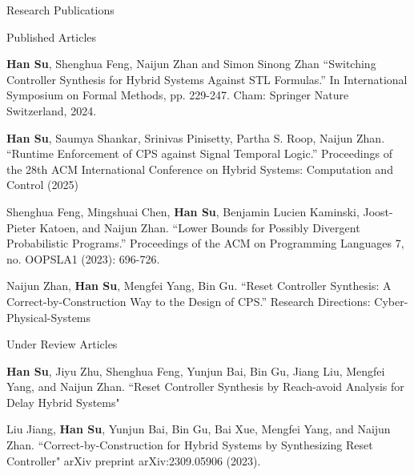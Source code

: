 \documentclass[
	10pt, %
]{resume} %
\newcommand{\fileicon}{\scriptsize{\textcolor{myblue}{\faFile}}}
\begin{document}
\begin{rSection}{Research Publications}
    \begin{rSubsection}{Published Articles}{}{}{}
		\item \textbf{Han Su}, Shenghua Feng, Naijun Zhan and Simon Sinong Zhan ``Switching Controller Synthesis for Hybrid Systems Against STL Formulas.'' In International Symposium on Formal Methods, pp. 229-247. Cham: Springer Nature Switzerland, 2024. \hfill \href{https://link.springer.com/content/pdf/10.1007/978-3-031-71177-0_15.pdf?pdf=inline%20link}{\fileicon}
		\item \textbf{Han Su}, Saumya Shankar, Srinivas Pinisetty, Partha S. Roop, Naijun Zhan. ``Runtime Enforcement of CPS against Signal Temporal Logic.'' Proceedings of the 28th ACM International Conference on Hybrid Systems: Computation and Control (2025)\hfill\href{https://arxiv.org/pdf/2502.11584}{\fileicon}
		\item Shenghua Feng, Mingshuai Chen, \textbf{Han Su}, Benjamin Lucien Kaminski, Joost-Pieter Katoen, and Naijun Zhan. ``Lower Bounds for Possibly Divergent Probabilistic Programs.'' Proceedings of the ACM on Programming Languages 7, no. OOPSLA1 (2023): 696-726.\hfill \href{https://dl.acm.org/doi/pdf/10.1145/3586051}{\fileicon}
		\item Naijun Zhan, \textbf{Han Su}, Mengfei Yang, Bin Gu. ``Reset Controller Synthesis: A Correct-by-Construction Way to the Design of CPS.'' Research Directions: Cyber-Physical-Systems 
	\end{rSubsection}
    \begin{rSubsection}{Under Review Articles}{}{}{}
		\item \textbf{Han Su}, Jiyu Zhu, Shenghua Feng, Yunjun Bai, Bin Gu, Jiang Liu, Mengfei Yang, and Naijun Zhan. ``Reset Controller Synthesis by Reach-avoid Analysis for Delay Hybrid Systems"
		\qquad \hfill \href{https://arxiv.org/pdf/2309.05908}{\fileicon}
        \item Liu Jiang, \textbf{Han Su}, Yunjun Bai, Bin Gu, Bai Xue, Mengfei Yang, and Naijun Zhan. ``Correct-by-Construction for Hybrid Systems by Synthesizing Reset Controller" arXiv preprint arXiv:2309.05906 (2023).\hfill \href{https://arxiv.org/pdf/2309.05906}{\fileicon}
	\end{rSubsection}
\end{rSection}
\end{document}
